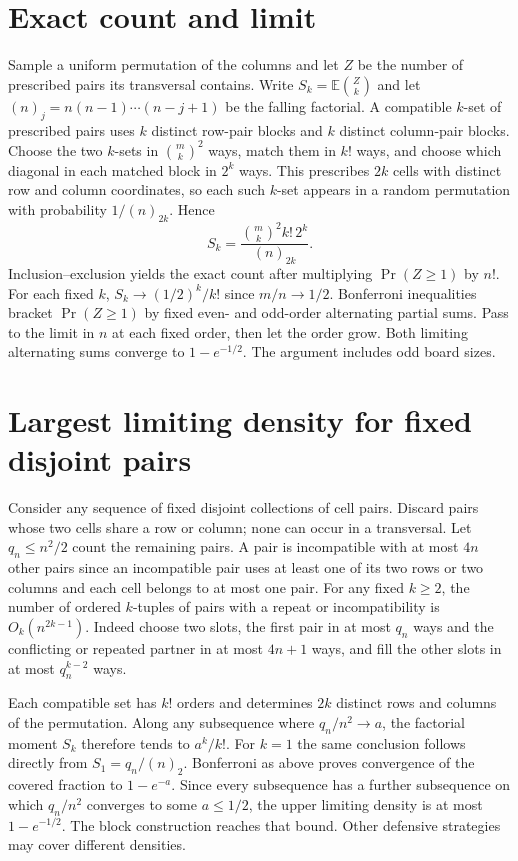 \documentclass[11pt]{amsart}
\begin{document}
\section{Exact count and limit}
Sample a uniform permutation of the columns and let \(Z\) be the number of prescribed pairs its transversal contains. Write \(S_k=\mathbb E\binom Zk\) and let \((n)_j=n(n-1)\cdots(n-j+1)\) be the falling factorial. A compatible \(k\)-set of prescribed pairs uses \(k\) distinct row-pair blocks and \(k\) distinct column-pair blocks. Choose the two \(k\)-sets in \(\binom mk^2\) ways, match them in \(k!\) ways, and choose which diagonal in each matched block in \(2^k\) ways. This prescribes \(2k\) cells with distinct row and column coordinates, so each such \(k\)-set appears in a random permutation with probability \(1/(n)_{2k}\). Hence
\[
                     S_k=\frac{\binom mk^2 k!\,2^k}{(n)_{2k}}.
\]
Inclusion--exclusion yields the exact count after multiplying \(\Pr(Z\ge1)\) by \(n!\). For each fixed \(k\), \(S_k\to(1/2)^k/k!\) since \(m/n\to1/2\). Bonferroni inequalities bracket \(\Pr(Z\ge1)\) by fixed even- and odd-order alternating partial sums. Pass to the limit in \(n\) at each fixed order, then let the order grow. Both limiting alternating sums converge to \(1-e^{-1/2}\). The argument includes odd board sizes.

\section{Largest limiting density for fixed disjoint pairs}
Consider any sequence of fixed disjoint collections of cell pairs. Discard pairs whose two cells share a row or column; none can occur in a transversal. Let \(q_n\le n^2/2\) count the remaining pairs. A pair is incompatible with at most \(4n\) other pairs since an incompatible pair uses at least one of its two rows or two columns and each cell belongs to at most one pair. For any fixed \(k\ge2\), the number of ordered \(k\)-tuples of pairs with a repeat or incompatibility is \(O_k(n^{2k-1})\). Indeed choose two slots, the first pair in at most \(q_n\) ways and the conflicting or repeated partner in at most \(4n+1\) ways, and fill the other slots in at most \(q_n^{k-2}\) ways.

Each compatible set has \(k!\) orders and determines \(2k\) distinct rows and columns of the permutation. Along any subsequence where \(q_n/n^2\to a\), the factorial moment \(S_k\) therefore tends to \(a^k/k!\). For \(k=1\) the same conclusion follows directly from \(S_1=q_n/(n)_2\). Bonferroni as above proves convergence of the covered fraction to \(1-e^{-a}\). Since every subsequence has a further subsequence on which \(q_n/n^2\) converges to some \(a\le1/2\), the upper limiting density is at most \(1-e^{-1/2}\). The block construction reaches that bound. Other defensive strategies may cover different densities.
\end{document}
